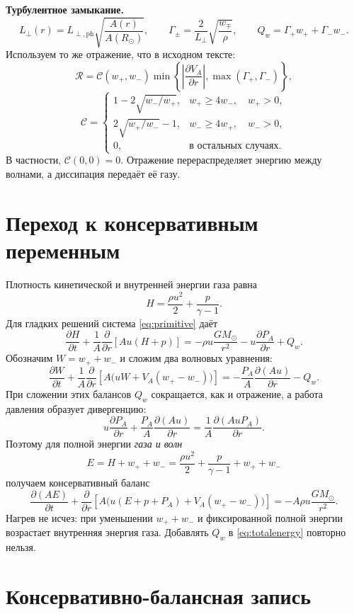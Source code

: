 \documentclass[11pt,a4paper]{article}
\newcommand{\PA}{P_A}
\newcommand{\VA}{V_A}
\newcommand{\Rref}{\mathcal R}
\newcommand{\ph}{\mathrm{ph}}
\begin{document}
\textbf{Турбулентное замыкание.}
\[
 L_\perp(r)=L_{\perp,\ph}\sqrt{\frac{A(r)}{A(R_\odot)}},\qquad
 \Gamma_\pm=\frac{2}{L_\perp}\sqrt{\frac{w_\mp}{\rho}},\qquad
 Q_w=\Gamma_+w_++\Gamma_-w_-.
\]
Используем то же отражение, что в исходном тексте:
\[
 \Rref=\mathcal C(w_+,w_-)
 \min\!\left\{\left|\frac{\partial\VA}{\partial r}\right|,
                 \max(\Gamma_+,\Gamma_-)\right\},
\]
\[
 \mathcal C=
 \begin{cases}
  1-2\sqrt{w_-/w_+},&w_+\ge4w_-,\quad w_+>0,\\[3pt]
  2\sqrt{w_+/w_-}-1,&w_-\ge4w_+,\quad w_->0,\\[3pt]
  0,&\text{в остальных случаях}.
 \end{cases}
\]
В частности, $\mathcal C(0,0)=0$.
Отражение перераспределяет энергию между волнами,
а диссипация передаёт её газу.

\section{Переход к консервативным переменным}

Плотность кинетической и внутренней энергии газа равна
\[
 H=\frac{\rho u^2}{2}+\frac{p}{\gamma-1}.
\]
Для гладких решений система \eqref{eq:primitive} даёт
\[
 \frac{\partial H}{\partial t}+\frac1A\frac{\partial}{\partial r}\!\left[Au(H+p)\right]
 =-\rho u\frac{GM_\odot}{r^2}-u\frac{\partial\PA}{\partial r}+Q_w.
\]
Обозначим $W=w_++w_-$ и сложим два волновых уравнения:
\[
 \frac{\partial W}{\partial t}+\frac1A\frac{\partial}{\partial r}
 \!\left[A\bigl(uW+\VA(w_+-w_-)\bigr)\right]
 =-\frac{\PA}{A}\frac{\partial(Au)}{\partial r}-Q_w.
\]
При сложении этих балансов $Q_w$ сокращается, как и отражение,
а работа давления образует дивергенцию:
\[
 u\frac{\partial\PA}{\partial r}+\frac{\PA}{A}\frac{\partial(Au)}{\partial r}
 =\frac1A\frac{\partial(Au\PA)}{\partial r}.
\]
Поэтому для полной энергии \emph{газа и волн}
\[
 E=H+w_++w_-=
 \frac{\rho u^2}{2}+\frac{p}{\gamma-1}+w_++w_-
\]
получаем консервативный баланс
\begin{equation}
 \frac{\partial(AE)}{\partial t}+\frac{\partial}{\partial r}
 \!\left[A\bigl(u(E+p+\PA)+\VA(w_+-w_-)\bigr)\right]
 =-A\rho u\frac{GM_\odot}{r^2}.
\label{eq:totalenergy}
\end{equation}
Нагрев не исчез: при уменьшении $w_++w_-$ и фиксированной полной
энергии возрастает внутренняя энергия газа. Добавлять $Q_w$
в \eqref{eq:totalenergy} повторно нельзя.

\section{Консервативно-балансная запись}
\end{document}
